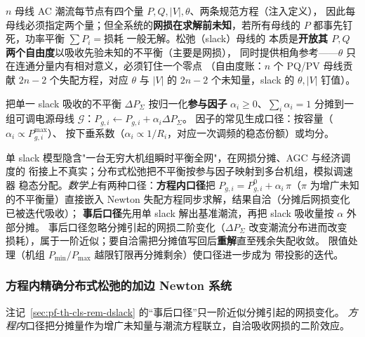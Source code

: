 $n$ 母线 AC 潮流每节点有四个量 $P,Q,|V|,\theta$、两条规范方程（注入定义），
因此每母线必须指定两个量；但全系统的\textbf{网损在求解前未知}，若所有母线的
$P$ 都事先钉死，功率平衡 $\sum P_i=\text{损耗}$ 一般无解。松弛（slack）母线的
本质是\textbf{开放其 $P,Q$ 两个自由度}以吸收先验未知的不平衡（主要是网损），
同时提供相角参考——$\theta$ 只在连通分量内有相对意义，必须钉住一个零点
（自由度账：$n$ 个 PQ/PV 母线贡献 $2n-2$ 个失配方程，对应 $\theta$ 与 $|V|$
的 $2n-2$ 个未知量，slack 的 $\theta,|V|$ 钉值）。

\begin{definition}[分布式松弛与参与因子]\label{sec:pf-th-cls-def-dslack}
把单一 slack 吸收的不平衡 $\Delta P_\Sigma$ 按归一化\textbf{参与因子}
$\alpha_i\ge0$、$\sum_i\alpha_i=1$ 分摊到一组可调电源母线
$\mathcal G$：$P_{g,i}\leftarrow P_{g,i}+\alpha_i\Delta P_\Sigma$。
因子的常见生成口径：按容量（$\alpha_i\propto P_{g,i}^{\max}$）、
按下垂系数（$\alpha_i\propto1/R_i$，对应一次调频的稳态份额）或均分。
\end{definition}

\begin{remark}\label{sec:pf-th-cls-rem-dslack}
单 slack 模型隐含"一台无穷大机组瞬时平衡全网"，在网损分摊、AGC 与经济调度的
衔接上不真实；分布式松弛把不平衡按参与因子映射到多台机组，模拟调速器
稳态分配。\emph{数学上}有两种口径：\textbf{方程内口径}把
$P_{g,i}=P_{g,i}^0+\alpha_i\,\pi$（$\pi$ 为增广未知的不平衡量）直接嵌入
Newton 失配方程同步求解，结果自洽（分摊后网损变化已被迭代吸收）；
\textbf{事后口径}先用单 slack 解出基准潮流，再把 slack 吸收量按 $\alpha$ 外部分摊。
事后口径忽略分摊引起的网损二阶变化（$\Delta P_\Sigma$ 改变潮流分布进而改变
损耗），属于一阶近似；要自洽需把分摊值写回后\textbf{重解}直至残余失配收敛。
限值处理（机组 $P_{\min}/P_{\max}$ 越限钉限再分摊剩余）使口径进一步成为
带投影的迭代。
\end{remark}

\subsubsection{方程内精确分布式松弛的加边 Newton 系统}\label{sec:pf-th-cls-augslack}
注记~\ref{sec:pf-th-cls-rem-dslack} 的“事后口径”只一阶近似分摊引起的网损变化。
\emph{方程内}口径把分摊量作为增广未知量与潮流方程联立，自洽吸收网损的二阶效应。

